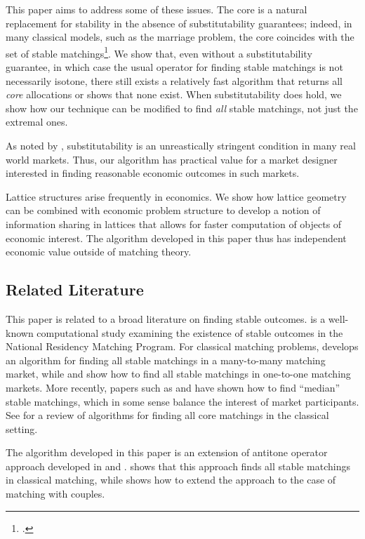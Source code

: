 \documentclass[11pt,reqno]{amsart}
\theoremstyle{definition}
\numberwithin{equation}{section}
\begin{document}
This paper aims to address some of these issues.
The core is a natural replacement for stability in the absence of substitutability guarantees; indeed, in many classical models, such as the marriage problem, the core coincides with the set of stable matchings\footnote{\cite{RothSotomayor1990}.}. 
We show that, even without a substitutability guarantee, in which case the usual operator for finding stable matchings is not necessarily isotone, there still exists a relatively fast algorithm that returns all \emph{core} allocations or shows that none exist. 
When substitutability does hold, we show how our technique can be modified to find \emph{all} stable matchings, not just the extremal ones.

As noted by \cite{KlausKlijn2005}, substitutability is an unreastically stringent condition in many real world markets.
Thus, our algorithm has practical value for a market designer interested in finding reasonable economic outcomes in such markets.

Lattice structures arise frequently in economics.
We show how lattice geometry can be combined with economic problem structure to develop a notion of information sharing in lattices that allows for faster computation of objects of economic interest.  
The algorithm developed in this paper thus has independent economic value outside of matching theory. 

\subsection{Related Literature}

This paper is related to a broad literature on finding stable outcomes.
\cite{RothPeranson1999} is a well-known computational study examining the existence of stable outcomes in the National Residency Matching Program. 
For classical matching problems, \cite{Martinezetal2004} develops an algorithm for finding all stable matchings in a many-to-many matching market, while \cite{McvitieWilson1971} and \cite{IrvingLeather1986} show how to find all stable matchings in one-to-one matching markets.
More recently, papers such as \cite{Sethuramanetal2006} and \cite{SchwarzYenmez2011} have shown how to find ``median'' stable matchings, which in some sense balance the interest of market participants. 
See \cite{GusfieldIrving1989} for a review of algorithms for finding all core matchings in the classical setting.

The algorithm developed in this paper is an extension of antitone operator approach developed in \cite{Echenique2007Equilibria} and \cite{EcheniqueYenmez2013}.
\cite{kominers2010matching} shows that this approach finds all stable matchings in classical matching, while \cite{Kojima2007b} shows how to extend the approach to the case of matching with couples.
\end{document}

